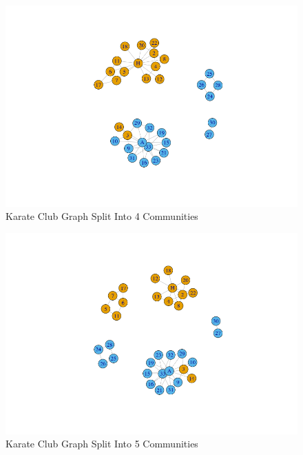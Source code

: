 \documentclass[letterpaper,10pt]{article}
\begin{document}
\begin{figure}
\includegraphics[scale=0.5]{clubSplit4.png}
\caption{Karate Club Graph Split Into 4 Communities}
\label{fig:4way}
\end{figure}

\begin{figure}
\includegraphics[scale=0.5]{clubSplit5.png}
\caption{Karate Club Graph Split Into 5 Communities}
\label{fig:5way}
\end{figure}
\newpage

        
\end{document}
